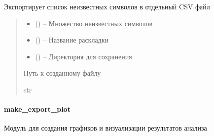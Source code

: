 \documentclass[a4paper,11pt,russian,openany,oneside]{sphinxmanual}
\begin{document}
\begin{savenotes}\begin{fulllineitems}
\label{\detokenize{data_module:data_module.make_export_file.export_unknown_characters_csv}}
\pysigstartsignatures
\pysiglinewithargsret
{}
{\sphinxparamcomma {}\sphinxparamcomma {}}
{}
\pysigstopsignatures
\sphinxAtStartPar
Экспортирует список неизвестных символов в отдельный CSV файл
\begin{quote}\begin{description}
\begin{itemize}
\item {} 
\sphinxAtStartPar
{} () – Множество неизвестных символов

\item {} 
\sphinxAtStartPar
{} () – Название раскладки

\item {} 
\sphinxAtStartPar
{} () – Директория для сохранения

\end{itemize}

\sphinxAtStartPar
Путь к созданному файлу

\sphinxAtStartPar
str

\end{description}\end{quote}

\end{fulllineitems}\end{savenotes}



\paragraph{make\_export\_plot}
\label{\detokenize{data_module:module-data_module.make_export_plot}}\label{\detokenize{data_module:make-export-plot}}
\sphinxAtStartPar
Модуль для создания графиков и визуализации результатов анализа
\end{document}
